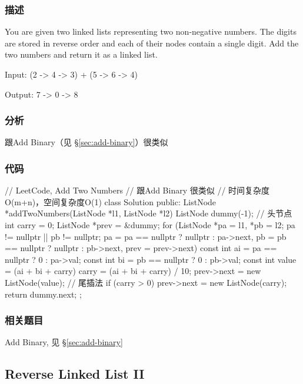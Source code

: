 \subsubsection{描述}
You are given two linked lists representing two non-negative numbers. The 
digits are stored in reverse order and each of their nodes contain a single 
digit. Add the two numbers and return it as a linked list.

Input: {\small {} (2 -> 4 -> 3) + (5 -> 6 -> 4)}

Output: {\small {} 7 -> 0 -> 8}


\subsubsection{分析}
跟Add Binary（见 \S \ref{sec:add-binary}）很类似


\subsubsection{代码}
\begin{Code}
	// LeetCode, Add Two Numbers
	// 跟Add Binary 很类似
	// 时间复杂度O(m+n)，空间复杂度O(1)
	class Solution {
		public:
		ListNode *addTwoNumbers(ListNode *l1, ListNode *l2) {
			ListNode dummy(-1); // 头节点
			int carry = 0;
			ListNode *prev = &dummy;
			for (ListNode *pa = l1, *pb = l2;
			pa != nullptr || pb != nullptr;
			pa = pa == nullptr ? nullptr : pa->next,
			pb = pb == nullptr ? nullptr : pb->next,
			prev = prev->next) {
				const int ai = pa == nullptr ? 0 : pa->val;
				const int bi = pb == nullptr ? 0 : pb->val;
				const int value = (ai + bi + carry) %
				carry = (ai + bi + carry) / 10;
				prev->next = new ListNode(value); // 尾插法
			}
			if (carry > 0)
			prev->next = new ListNode(carry);
			return dummy.next;
		}
	};
\end{Code}


\subsubsection{相关题目}

\begindot
\item Add Binary, 见 \S \ref{sec:add-binary}
\myenddot


\subsection{Reverse Linked List II}
\label{sec:reverse-linked-list-ii}


